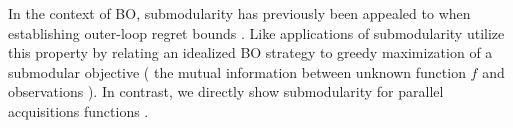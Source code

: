 In the context of BO, submodularity has previously been appealed to when establishing outer-loop regret bounds \cite{srinivas10,contal2013parallel,desautels2014parallelizing}. Like applications of submodularity utilize this property by relating an idealized BO strategy to greedy maximization of a submodular objective (\eg{} the mutual information between unknown function \(f\) and observations \data{}). In contrast, we directly show submodularity for  parallel acquisitions functions \perse. 
%








